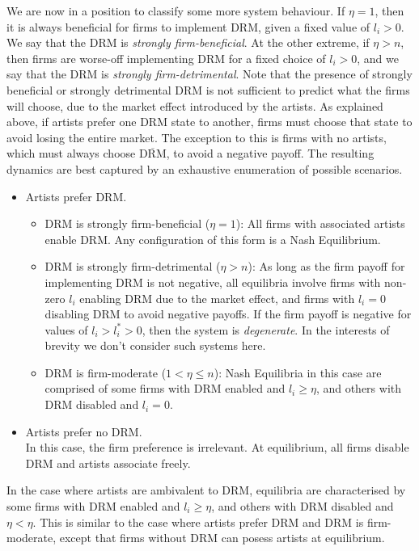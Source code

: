 \documentclass[letter,12pt]{article}
\numberwithin{equation}{section}
\newcommand{\drm}{\text{DRM}}
\newcommand{\nodrm}{\overline{\drm}}
\begin{document}
We are now in a position to classify some more system behaviour. If $\eta = 1$, then it is always beneficial for firms to implement DRM, given a fixed value of $l_i > 0$. We say that the DRM is \textit{strongly firm-beneficial}. At the other extreme, if $\eta > n$, then firms are worse-off implementing DRM for a fixed choice of $l_i > 0$, and we say that the DRM is \textit{strongly firm-detrimental}. Note that the presence of strongly beneficial or strongly detrimental DRM is not sufficient to predict what the firms will choose, due to the market effect introduced by the artists. As explained above, if artists prefer one DRM state to another, firms must choose that state to avoid losing the entire market. The exception to this is firms with no artists, which must always choose $\nodrm$, to avoid a negative payoff. The resulting dynamics are best captured by an exhaustive enumeration of possible scenarios.
\begin{itemize}
\item Artists prefer DRM.
	\begin{itemize}
	\item DRM is strongly firm-beneficial ($\eta = 1$): All firms with associated artists enable DRM. Any configuration of this form is a Nash Equilibrium.
	\item DRM is strongly firm-detrimental ($\eta > n$): As long as the firm payoff for implementing DRM is not negative, all equilibria involve firms with non-zero $l_i$ enabling DRM due to the market effect, and firms with $l_i = 0$ disabling DRM to avoid negative payoffs. If the firm payoff is negative for values of $l_i > l_i^* > 0$, then the system is \textit{degenerate}. In the interests of brevity we don't consider such systems here.
	\item DRM is firm-moderate ($1 < \eta \leq n$): Nash Equilibria in this case are comprised of some firms with DRM enabled and $l_i \geq \eta$, and others with DRM disabled and $l_i = 0$.
	\end{itemize}
\item Artists prefer no DRM.\\
In this case, the firm preference is irrelevant. At equilibrium, all firms disable DRM and artists associate freely.
\end{itemize}

In the case where artists are ambivalent to DRM, equilibria are characterised by some firms with DRM enabled and $l_i \geq \eta$, and others with DRM disabled and $\eta < \eta$. This is similar to the case where artists prefer DRM and DRM is firm-moderate, except that firms without DRM can posess artists at equilibrium.\\
\end{document}
